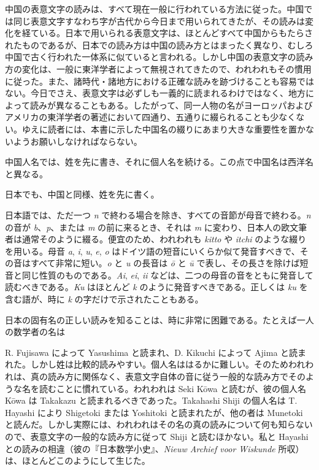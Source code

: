 \documentclass[11pt]{article}
\newcommand{\scanpage}[2]{\clearpage\setcounter{footnote}{0}\noindent{\footnotesize\color{gray}PDF #1 頁 · #2}\par\medskip}
\newcommand{\scanfooter}{}
\begin{document}
中国の表意文字の読みは、すべて現在一般に行われている方法に従った。中国では同じ表意文字すなわち字が古代から今日まで用いられてきたが、その読みは変化を経ている。日本で用いられる表意文字は、ほとんどすべて中国からもたらされたものであるが、日本での読み方は中国の読み方とはまったく異なり、むしろ中国で古く行われた一体系に似ていると言われる。しかし中国の表意文字の読み方の変化は、一般に東洋学者によって無視されてきたので、われわれもその慣用に従った。また、諸時代・諸地方における正確な読みを跡づけることも容易ではない。今日でさえ、表意文字は必ずしも一義的に読まれるわけではなく、地方によって読みが異なることもある。したがって、同一人物の名がヨーロッパおよびアメリカの東洋学者の著述において四通り、五通りに綴られることも少なくない。ゆえに読者には、本書に示した中国名の綴りにあまり大きな重要性を置かないようお願いしなければならない。

中国人名では、姓を先に書き、それに個人名を続ける。この点で中国名は西洋名と異なる。

日本でも、中国と同様、姓を先に書く。

日本語では、ただ一つ \emph{n} で終わる場合を除き、すべての音節が母音で終わる。\emph{n} の音が \emph{b}、\emph{p}、または \emph{m} の前に来るとき、それは \emph{m} に変わり、日本人の欧文筆者は通常そのように綴る。便宜のため、われわれも \emph{kitto} や \emph{itchi} のような綴りを用いる。母音 \emph{a}, \emph{i}, \emph{u}, \emph{e}, \emph{o} はドイツ語の短音にいくらか似て発音すべきで、その音はすべて非常に短い。\emph{o} と \emph{u} の長音は \emph{ō} と \emph{ū} で表し、その長さを除けば短音と同じ性質のものである。\emph{Ai}, \emph{ei}, \emph{ii} などは、二つの母音の音をともに発音して読むべきである。\emph{Ku} はほとんど \emph{k} のように発音すべきである。正しくは \emph{ku} を含む語が、時に \emph{k} の字だけで示されたこともある。

日本の固有名の正しい読みを知ることは、時に非常に困難である。たとえば一人の数学者の名は
\scanfooter

\scanpage{0012}{緒言、第3頁}
R. Fujisawa によって Yasushima と読まれ、D. Kikuchi によって Ajima と読まれた。しかし姓は比較的読みやすい。個人名ははるかに難しい。そのためわれわれは、真の読み方に関係なく、表意文字自体の音に従う一般的な読み方でそのような名を読むことに慣れている。われわれは Seki Kōwa と読むが、彼の個人名 Kōwa は Takakazu と読まれるべきであった。Takahashi Shiji の個人名は T. Hayashi により Shigetoki または Yoshitoki と読まれたが、他の者は Munetoki と読んだ。しかし実際には、われわれはその名の真の読みについて何も知らないので、表意文字の一般的な読み方に従って Shiji と読むほかない。私と Hayashi との読みの相違（彼の『日本数学小史』、\emph{Nieuw Archief voor Wiskunde} 所収）は、ほとんどこのようにして生じた。
\end{document}
